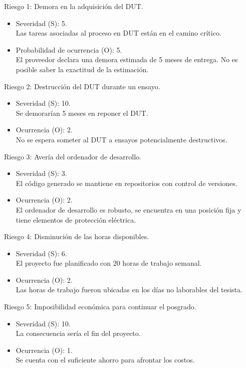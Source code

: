 \documentclass[
11pt, %
]{charter}
\begin{document}
Riesgo 1: Demora en la adquisición del DUT.
\begin{itemize}
	\item Severidad (S): 5.\\
	Las tareas asociadas al proceso en DUT están en el camino crítico.
	\item Probabilidad de ocurrencia (O): 5.\\
	El proveedor declara una demora estimada de 5 meses de entrega. No es posible saber la exactitud de la estimación.
\end{itemize}   

Riesgo 2: Destrucción del DUT durante un ensayo.
\begin{itemize}
	\item Severidad (S): 10. \\
	Se demorarían 5 meses en reponer el DUT.
	\item Ocurrencia (O): 2. \\
	No se espera someter al DUT a ensayos potencialmente destructivos.
\end{itemize}

Riesgo 3: Avería del ordenador de desarrollo.
\begin{itemize}
	\item Severidad (S): 3. \\
	El código generado se mantiene en repositorios con control de versiones.
	\item Ocurrencia (O): 2. \\
	El ordenador de desarrollo es robusto, se encuentra en una posición fija y tiene elementos de protección eléctrica.
\end{itemize}

Riesgo 4: Disminución de las horas disponibles.
\begin{itemize}
	\item Severidad (S): 6. \\
	El proyecto fue planificado con 20 horas de trabajo semanal.
	\item Ocurrencia (O): 2. \\
	Las horas de trabajo fueron ubicadas en los días no laborables del tesista.
\end{itemize}

Riesgo 5: Imposibilidad económica para continuar el posgrado.
\begin{itemize}
	\item Severidad (S): 10. \\
	La consecuencia sería el fin del proyecto.
	\item Ocurrencia (O): 1. \\
	Se cuenta con el suficiente ahorro para afrontar los costos.
\end{itemize}
\end{document}
